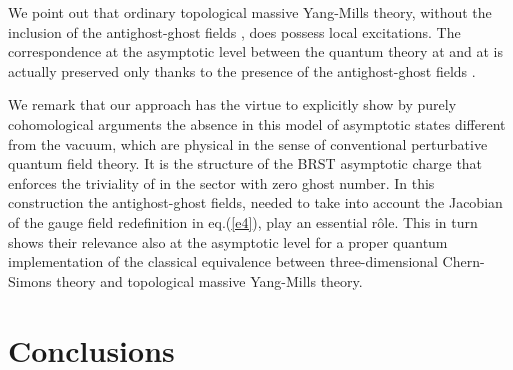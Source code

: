 \documentclass[a4paper,11pt]{article}
\begin{document}
We point out that ordinary topological massive Yang-Mills theory,
without the inclusion of the antighost-ghost fields \coordHE{},
does possess local excitations.
The correspondence at the asymptotic level between the quantum theory
at \coordHE{} and at \coordHE{} is actually preserved 
only thanks to the presence of the antighost-ghost fields \coordHE{}.

We remark that our approach has the virtue to explicitly show
by purely cohomological arguments the 
absence in this model
of asymptotic states different from the vacuum, which
are physical in the sense of conventional perturbative
quantum field theory.
%
It is the structure of the BRST asymptotic charge \coordHE{} that enforces
the triviality of \coordHE{} in the sector with zero ghost number.
In this construction the antighost-ghost fields, needed to take into
account the Jacobian of the gauge field redefinition in eq.(\ref{e4}),
play an essential r\^ole. This in turn  shows their relevance 
also at the asymptotic level for a proper 
quantum implementation of the classical equivalence between
three-dimensional Chern-Simons theory and
topological massive Yang-Mills theory.

\section{Conclusions}\label{sec7}
\end{document}
